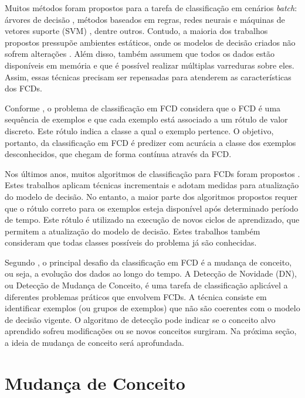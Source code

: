 \documentclass[qual, classic, a4paper]{ufbathesis}
\begin{document}
Muitos métodos foram propostos para a tarefa de classificação em cenários \textit{batch}:
árvores de decisão \cite{Breiman:Classification_Regression_Trees},
métodos baseados em regras, 
redes neurais e máquinas de vetores suporte (SVM) \cite{Vapnik1998}, 
dentre outros.
Contudo, a maioria dos trabalhos propostos pressupõe ambientes estáticos, onde os modelos de decisão criados não sofrem alterações \cite{Aggarwal:2006:DSM:1196418}.
Além disso, também assumem que todos os dados estão disponíveis em memória e que é possível realizar múltiplas varreduras sobre eles.
Assim, essas técnicas precisam ser repensadas para atenderem as características dos FCDs.

Conforme \cite{Chen:Tu}, o problema de classificação em FCD considera que o FCD é uma sequência de exemplos e que cada exemplo está associado a um rótulo de valor discreto.
Este rótulo indica a classe a qual o exemplo pertence.
O objetivo, portanto, da classificação em FCD é predizer com acurácia a classe dos exemplos desconhecidos, que chegam de forma contínua através da FCD.

Nos últimos anos, muitos algoritmos de classificação para FCDs foram propostos 
\cite{Domingos:2000:MHD:347090.347107, Bifet:2013:EDS:2480362.2480516, Wang:2003:MCD:956750.956778, Aggarwal:2004:DCD:1014052.1014110, Gama:2003:ADT:956750.956813}.
Estes trabalhos aplicam técnicas incrementais e adotam medidas para atualização do modelo de decisão.
No entanto, a maior parte dos algoritmos propostos requer que o rótulo correto para os exemplos esteja disponível após determinado período de tempo.
Este rótulo é utilizado na execução de novos ciclos de aprendizado, que permitem a atualização do modelo de decisão.
Estes trabalhos também consideram que todas classes possíveis do problema já são conhecidas. 

Segundo \cite{Aggarwal:2006:DSM:1196418}, o principal desafio da classificação em FCD é a mudança de conceito,
ou seja, a evolução dos dados ao longo do tempo.
A Detecção de Novidade (DN), ou Detecção de Mudança de Conceito, é uma tarefa de classificação aplicável a diferentes problemas práticos que envolvem FCDs.
A técnica consiste em identificar exemplos (ou grupos de exemplos) que não são coerentes com o modelo de decisão vigente.
O algoritmo de detecção pode indicar se o conceito alvo aprendido sofreu modificações ou se novos conceitos surgiram.
Na próxima seção, a ideia de mudança de conceito será aprofundada.

\section{Mudança de Conceito}
\blindtext
\end{document}
